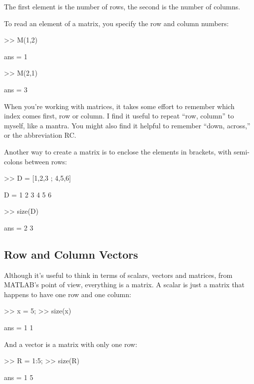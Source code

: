 The first element is the number of rows, the second is the number of
columns.


To read an element of a matrix, you specify the row and column numbers:

\begin{code}
>> M(1,2)

ans = 1

>> M(2,1)

ans = 3
\end{code}

When you're working with matrices, it takes some effort to remember
which index comes first, row or column.  I find it useful to repeat
``row, column'' to myself, like a mantra.  You might also find it
helpful to remember ``down, across,'' or the abbreviation RC.

Another way to create a matrix is to enclose the elements in
brackets, with semi-colons between rows:

\begin{code}
>> D = [1,2,3 ; 4,5,6]

D =  1     2     3
     4     5     6

>> size(D)

ans = 2     3
\end{code}


\subsection{Row and Column Vectors}
\label{rowvector}


Although it's useful to think in terms of scalars, vectors and matrices,
from MATLAB's point of view, everything is a matrix.  A scalar
is just a matrix that happens to have one row and one column:

\begin{code}
>> x = 5;
>> size(x)

ans = 1     1
\end{code}

And a vector is a matrix with only one row:

\begin{code}
>> R = 1:5;
>> size(R)

ans = 1     5
\end{code}

